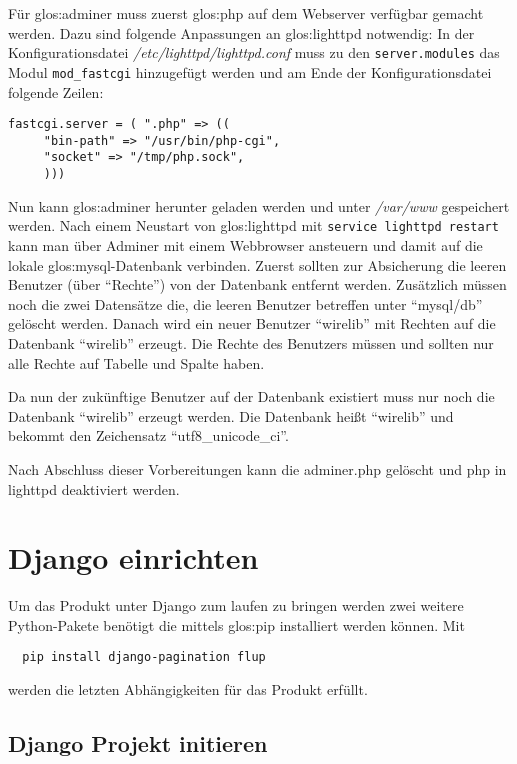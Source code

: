 Für \Gls{glos:adminer} muss zuerst \Gls{glos:php} auf dem Webserver verfügbar
gemacht werden. Dazu sind folgende Anpassungen an \Gls{glos:lighttpd}
notwendig:
In der Konfigurationsdatei \emph{/etc/lighttpd/lighttpd.conf} muss zu den
\lstinline{server.modules} das Modul \lstinline{mod_fastcgi} hinzugefügt
werden und am Ende der Konfigurationsdatei folgende Zeilen:

\begin{lstlisting}
fastcgi.server = ( ".php" => (( 
     "bin-path" => "/usr/bin/php-cgi",
     "socket" => "/tmp/php.sock",
     )))
\end{lstlisting}

Nun kann \Gls{glos:adminer} herunter geladen werden und unter \emph{/var/www}
gespeichert werden. Nach einem Neustart von \Gls{glos:lighttpd} mit
\lstinline{service lighttpd restart} kann man über Adminer mit einem Webbrowser
ansteuern und damit auf die lokale \Gls{glos:mysql}-Datenbank verbinden. Zuerst
sollten zur Absicherung die leeren Benutzer (über "`Rechte"') von der Datenbank
entfernt werden. Zusätzlich müssen noch die zwei Datensätze die, die leeren
Benutzer betreffen unter "`mysql/db"' gelöscht werden.  Danach wird ein neuer
Benutzer "`wirelib"' mit Rechten auf die Datenbank "`wirelib"' erzeugt. Die
Rechte des Benutzers müssen und sollten nur alle Rechte auf Tabelle und Spalte
haben.

Da nun der zukünftige Benutzer auf der Datenbank existiert muss nur noch die
Datenbank "`wirelib"' erzeugt werden. Die Datenbank heißt "`wirelib"' und
bekommt den Zeichensatz "`utf8\_unicode\_ci"'.

Nach Abschluss dieser Vorbereitungen kann die adminer.php gelöscht und php in
lighttpd deaktiviert werden.

\section{Django einrichten}

Um das Produkt unter Django zum laufen zu bringen werden zwei weitere
Python-Pakete benötigt die mittels \Gls{glos:pip} installiert werden können.
Mit 
\begin{lstlisting}
  pip install django-pagination flup
\end{lstlisting}
werden die letzten Abhängigkeiten für das Produkt erfüllt.

\subsection{Django Projekt initieren}

